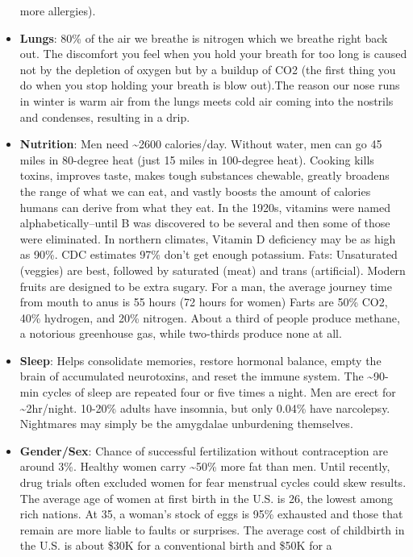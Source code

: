 \documentclass[
]{article}
\begin{document}
\begin{itemize}
  more allergies).
\item
  \textbf{Lungs}: 80\% of the air we breathe is nitrogen which we
  breathe right back out. The discomfort you feel when you hold your
  breath for too long is caused not by the depletion of oxygen but by a
  buildup of CO2 (the first thing you do when you stop holding your
  breath is blow out).The reason our nose runs in winter is warm air
  from the lungs meets cold air coming into the nostrils and condenses,
  resulting in a drip.
\item
  \textbf{Nutrition}: Men need \textasciitilde2600 calories/day. Without
  water, men can go 45 miles in 80-degree heat (just 15 miles in
  100-degree heat). Cooking kills toxins, improves taste, makes tough
  substances chewable, greatly broadens the range of what we can eat,
  and vastly boosts the amount of calories humans can derive from what
  they eat. In the 1920s, vitamins were named alphabetically--until B
  was discovered to be several and then some of those were eliminated.
  In northern climates, Vitamin D deficiency may be as high as 90\%. CDC
  estimates 97\% don't get enough potassium. Fats: Unsaturated (veggies)
  are best, followed by saturated (meat) and trans (artificial). Modern
  fruits are designed to be extra sugary. For a man, the average journey
  time from mouth to anus is 55 hours (72 hours for women) Farts are
  50\% CO2, 40\% hydrogen, and 20\% nitrogen. About a third of people
  produce methane, a notorious greenhouse gas, while two-thirds produce
  none at all.
\item
  \textbf{Sleep}: Helps consolidate memories, restore hormonal balance,
  empty the brain of accumulated neurotoxins, and reset the immune
  system. The \textasciitilde90-min cycles of sleep are repeated four or
  five times a night. Men are erect for \textasciitilde2hr/night.
  10-20\% adults have insomnia, but only 0.04\% have narcolepsy.
  Nightmares may simply be the amygdalae unburdening themselves.
\item
  \textbf{Gender/Sex}: Chance of successful fertilization without
  contraception are around 3\%. Healthy women carry \textasciitilde50\%
  more fat than men. Until recently, drug trials often excluded women
  for fear menstrual cycles could skew results. The average age of women
  at first birth in the U.S. is 26, the lowest among rich nations. At
  35, a woman's stock of eggs is 95\% exhausted and those that remain
  are more liable to faults or surprises. The average cost of childbirth
  in the U.S. is about \$30K for a conventional birth and \$50K for a

\end{itemize}
\end{document}
